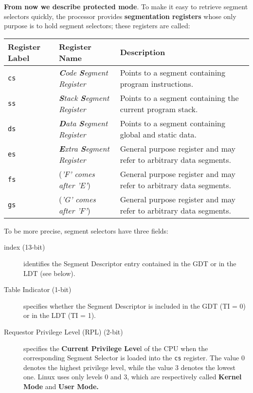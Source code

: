 \documentclass[10pt,a4paper]{article}
\begin{document}
\textbf{From now we describe protected mode}. To make it easy to retrieve segment selectors quickly, the processor provides \textbf{segmentation registers} whose only purpose is to hold segment selectors; these registers are called:

\begin{center}
\begin{tabular}{l|l|p{13cm}} 

\toprule
Register Label & Register Name & Description \\
\midrule

\texttt{cs} & \textit{\textbf{C}ode \textbf{S}egment Register} & Points to a segment containing program instructions.

\\
\texttt{ss} & \textit{\textbf{S}tack \textbf{S}egment Register} & Points to a segment containing the current program stack.

\\
\texttt{ds} & \textit{\textbf{D}ata \textbf{S}egment Register} & Points to a segment containing global and static data.

\\
\texttt{es} & \textit{\textbf{E}xtra \textbf{S}egment Register} & General purpose register and may refer to arbitrary data segments.

\\
\texttt{fs} & (\textit{'F' comes after 'E'}) & General purpose register and may refer to arbitrary data segments.

\\
\texttt{gs} & (\textit{'G' comes after 'F'}) & General purpose register and may refer to arbitrary data segments.

\\
\bottomrule
\end{tabular}
\end{center}


To be more precise, segment selectors have three fields:
\begin{description}
\item[index (13-bit)] identifies the Segment Descriptor entry contained in the GDT or in the LDT (see below).
\item[Table Indicator (1-bit)] specifies whether the Segment Descriptor is included in the GDT (TI = 0) or in the LDT (TI = 1).
\item[Requestor Privilege Level (RPL) (2-bit)] specifies the \textbf{Current Privilege Leve}l of the CPU when the corresponding Segment Selector is loaded into the \texttt{cs} register. The value 0 denotes the highest privilege level, while the value 3 denotes the lowest one. Linux uses only levels 0 and 3, which are respectively called \textbf{Kernel Mode} and \textbf{User Mode.}

\end{description}
\end{document}

